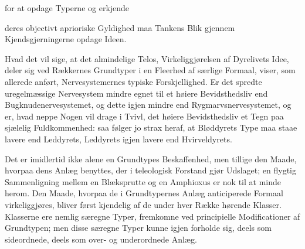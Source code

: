 \documentclass[12pt,a4paper]{book}
\begin{document}
for at opdage Typerne og erkjende

\setcounter{footnote}{0}
deres objectivt aprioriske Gyldighed maa Tankens Blik gjennem Kjendsgjerningerne
opdage Ideen.

Hvad det vil sige, at det almindelige Telos, Virkeliggjørelsen af Dyrelivets
Idee, deler sig ved Rækkernes Grundtyper i en Fleerhed af særlige Formaal,
viser, som allerede anført, Nervesystemernes typiske Forskjellighed. Er det
spredte uregelmæssige Nervesystem mindre egnet til et høiere Bevidsthedsliv end
Bugknudenervesystemet, og dette igjen mindre end Rygmarvsnervesystemet, og er,
hvad neppe Nogen vil drage i Tvivl, det høiere Bevidsthedsliv et Tegn paa
sjælelig Fuldkommenhed: saa følger jo strax heraf, at Bløddyrets Type maa staae
lavere end Leddyrets, Leddyrets igjen lavere end Hvirveldyrets.

Det er imidlertid ikke alene en Grundtypes Beskaffenhed, men tillige den Maade,
hvorpaa dens Anlæg benyttes, der i teleologisk Forstand gjør Udslaget; en
flygtig Sammenligning mellem en Blæksprutte og en Amphioxus er nok til at minde
herom. Den Maade, hvorpaa de i Grundtypernes Anlæg anticiperede Formaal
virkeliggjøres, bliver først kjendelig af de under hver Række hørende Klasser.
Klasserne ere nemlig særegne Typer, fremkomne ved principielle Modificationer af
Grundtypen; men disse særegne Typer kunne igjen forholde sig, deels som
sideordnede, deels som over- og underordnede Anlæg.
\end{document}
